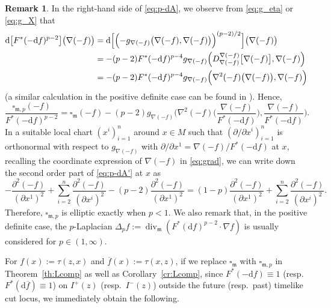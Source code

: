\documentclass[a4paper,11pt]{article}
\numberwithin{equation}{section}
\theoremstyle{definition}
\newtheorem{remark}[definition]{Remark}
\theoremstyle{plain}
\newcommand{\del}{\partial}
\newcommand{\dd}{\mathrm{d}}
\newcommand{\fm}{\ensuremath{\mathfrak{m}}}
\def\div{\mathop{\mathrm{div}}\nolimits}
\newcommand{\ol}[1]{\overline{#1}}
\begin{document}
\begin{remark}\label{rm:ellip}
In the right-hand side of \eqref{eq:p-dA}, we observe from \eqref{eq:g_eta} or \eqref{eq:g_X} that
\begin{align*}
\dd\bigl[ F^*(-\dd f)^{p-2} \bigr] \bigl( \nabla(-f) \bigr)
&= \dd\Bigl[ \Bigl( -g_{\nabla(-f)}\bigl( \nabla(-f),\nabla(-f) \bigr) \Bigr)^{(p-2)/2} \Bigr] \bigl( \nabla(-f) \bigr) \\
&= -(p-2)F^*(-\dd f)^{p-4} g_{\nabla(-f)}\Bigl( D^{\nabla(-f)}_{\nabla(-f)}\bigl[ \nabla(-f) \bigr],\nabla(-f) \Bigr) \\
&= -(p-2)F^*(-\dd f)^{p-4} g_{\nabla(-f)} \Bigl( \nabla^2(-f)\bigl( \nabla(-f) \bigr),\nabla(-f) \Bigr)
\end{align*}
(a similar calculation in the positive definite case can be found in \cite[\S 3.1]{OSbw}).
Hence,
\begin{equation}\label{eq:p-dA'}
\frac{\square_{\fm,p}(-f)}{F^*(-\dd f)^{p-2}}
=\square_{\fm}(-f) -(p-2)g_{\nabla(-f)} \biggl( \nabla^2(-f)\biggl( \frac{\nabla(-f)}{F^*(-\dd f)} \biggr),\frac{\nabla(-f)}{F^*(-\dd f)} \biggr).
\end{equation}
In a suitable local chart $(x^i)_{i=1}^n$ around $x \in M$ such that $(\del/\del x^i)_{i=1}^n$ is orthonormal with respect to $g_{\nabla(-f)}$ with $\del/\del x^1 =\nabla(-f)/F^*(-\dd f)$ at $x$,
recalling the coordinate expression of $\nabla(-f)$ in \eqref{eq:grad}, we can write down the second order part of \eqref{eq:p-dA'} at $x$ as
\[ -\frac{\del^2 (-f)}{(\del x^1)^2} +\sum_{i=2}^n \frac{\del^2 (-f)}{(\del x^i)^2} -(p-2)\frac{\del^2 (-f)}{(\del x^1)^2}
=(1-p)\frac{\del^2 (-f)}{(\del x^1)^2} +\sum_{i=2}^n \frac{\del^2 (-f)}{(\del x^i)^2}. \]
Therefore, $\square_{\fm,p}$ is elliptic exactly when $p<1$.
We also remark that, in the positive definite case, the $p$-Laplacian $\Delta_p f:=\div_\fm (F^*(\dd f)^{p-2} \cdot \nabla f)$ is usually considered for $p \in (1,\infty)$.
\end{remark}

For $f(x):=\tau(z,x)$ and $\ol{f}(x):=\tau(x,z)$, if we replace $\square_\fm$ with $\square_{\fm,p}$
in Theorem~\ref{th:Lcomp} as well as Corollary~\ref{cr:Lcomp},
since $F^*(-\dd f) \equiv 1$ (resp.\ $F^*(\dd\ol{f}) \equiv 1$) on $I^+(z)$ (resp.\ $I^-(z)$) outside the future (resp.\ past) timelike cut locus, we immediately obtain the following.
\end{document}
